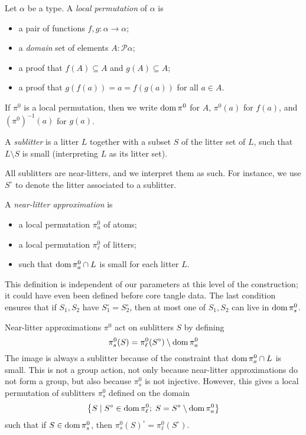 \documentclass{article}
\begin{document}
\begin{definition}
    Let \( \alpha \) be a type.
    A \emph{local permutation} of \( \alpha \) is
    \begin{itemize}
        \item a pair of functions \( f, g \colon \alpha \to \alpha \);
        \item a \emph{domain} set of elements \( A : \mathcal P \alpha \);
        \item a proof that \( f(A) \subseteq A \) and \( g(A) \subseteq A \);
        \item a proof that \( g(f(a)) = a = f(g(a)) \) for all \( a \in A \).
    \end{itemize}
    If \( \pi^0 \) is a local permutation, then we write \( \operatorname{dom} \pi^0 \) for \( A \), \( \pi^0(a) \) for \( f(a) \), and \( (\pi^0)^{-1}(a) \) for \( g(a) \).
\end{definition}
\begin{definition}
    A \emph{sublitter} is a litter \( L \) together with a subset \( S \) of the litter set of \( L \), such that \( L \setminus S \) is small (interpreting \( L \) as its litter set).
\end{definition}
\begin{remark}
    All sublitters are near-litters, and we interpret them as such.
    For instance, we use \( S^\circ \) to denote the litter associated to a sublitter.
\end{remark}
\begin{definition}
    A \emph{near-litter approximation} is
    \begin{itemize}
        \item a local permutation \( \pi^0_a \) of atoms;
        \item a local permutation \( \pi^0_\ell \) of litters;
        \item such that \( \operatorname{dom} \pi^0_a \cap L \) is small for each litter \( L \).
    \end{itemize}
\end{definition}
\begin{remark}
    This definition is independent of our parameters at this level of the construction; it could have even been defined before core tangle data.
    The last condition ensures that if \( S_1, S_2 \) have \( S_1^\circ = S_2^\circ \), then at most one of \( S_1, S_2 \) can live in \( \operatorname{dom} \pi^0_s \).
\end{remark}
\begin{lemma}
    Near-litter approximations \( \pi^0 \) act on sublitters \( S \) by defining
    \[ \pi^0_s(S) = \pi^0_\ell(S^\circ) \setminus \operatorname{dom} \pi^0_a \]
    The image is always a sublitter because of the constraint that \( \operatorname{dom} \pi^0_a \cap L \) is small.
    This is not a group action, not only because near-litter approximations do not form a group, but also because \( \pi^0_s \) is not injective.
    However, this gives a local permutation of sublitters \( \pi^0_s \) defined on the domain
    \[ \qty{S \mid S^\circ \in \operatorname{dom}\pi^0_\ell;\; S = S^\circ \setminus \operatorname{dom}\pi^0_a} \]
    such that if \( S \in \operatorname{dom} \pi^0_s \), then \( \pi^0_s(S)^\circ = \pi^0_\ell(S^\circ) \).
\end{lemma}
\end{document}
